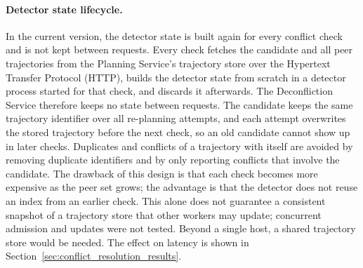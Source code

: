 \paragraph{Detector state lifecycle.}
In the current version, the detector state is built again for every conflict check and is not kept between requests. Every check fetches the candidate and all peer trajectories from the Planning Service's trajectory store over the Hypertext Transfer Protocol (HTTP), builds the detector state from scratch in a detector process started for that check, and discards it afterwards. The Deconfliction Service therefore keeps no state between requests. The candidate keeps the same trajectory identifier over all re-planning attempts, and each attempt overwrites the stored trajectory before the next check, so an old candidate cannot show up in later checks. Duplicates and conflicts of a trajectory with itself are avoided by removing duplicate identifiers and by only reporting conflicts that involve the candidate. The drawback of this design is that each check becomes more expensive as the peer set grows; the advantage is that the detector does not reuse an index from an earlier check. This alone does not guarantee a consistent snapshot of a trajectory store that other workers may update; concurrent admission and updates were not tested. Beyond a single host, a shared trajectory store would be needed. The effect on latency is shown in Section~\ref{sec:conflict_resolution_results}.

